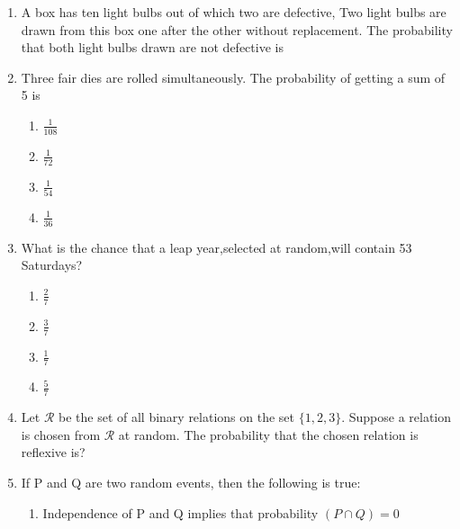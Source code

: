 \documentclass[journal,12pt,twocolumn]{IEEEtran}
\begin{document}
\begin{enumerate}
\solution

\item A box has ten light bulbs out of which two are defective, Two light bulbs are drawn from this box one after the other without replacement. The probability that both light bulbs drawn are not defective is 
\begin{enumerate}[label={\Alph*)}]
\end{enumerate}
\solution

%
\item Three fair dies are rolled simultaneously. The probability of getting a sum of 5 is
\begin{enumerate}
    \item $\frac{1}{108}$
    \item $\frac{1}{72}$
    \item $\frac{1}{54}$
    \item $\frac{1}{36}$
\end{enumerate}
%
\solution

\item What is the chance that a leap year,selected at random,will contain 53 Saturdays? \\
\begin{enumerate}
    \item  $\frac{2}{7}$ 
    \item  $\frac{3}{7}$ 
    \item  $\frac{1}{7}$ 
    \item  $\frac{5}{7}$ 
\end{enumerate}
\solution

%
\item Let $\mathcal{R}$  be the set of all binary relations on the set $\{1,2,3\}$. Suppose a relation is chosen from $\mathcal{R}$ at random. The probability that the chosen relation is reflexive is?
\\
\solution

%
\item If P and Q are two random events, then the following is true:
\begin{enumerate}[label = (\alph*)]
    \item Independence of P and Q implies that probability $(P\cap Q)=0 $ 

\end{enumerate}
\end{enumerate}
\end{document}
